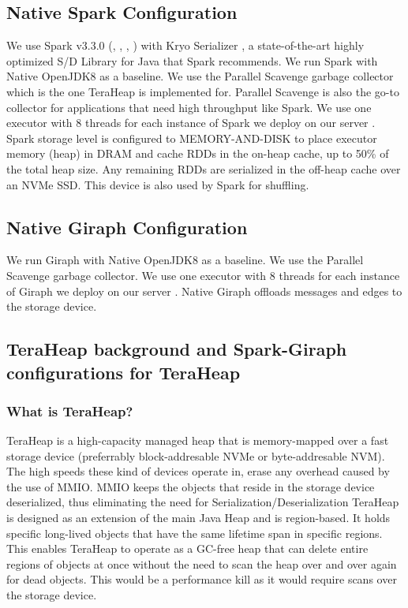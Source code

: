 \subsection{Native Spark Configuration}
We use Spark v3.3.0 (\cite{Building}, \cite{Tuning}, \cite{Conf}, \cite{Monitoring}) with Kryo Serializer \cite{Kryo}, a state-of-the-art highly
optimized S/D Library for Java that Spark recommends. We run Spark
with Native OpenJDK8 \cite{JDK8} as a baseline. We use the Parallel Scavenge
garbage collector which is the one TeraHeap is implemented for.
Parallel Scavenge is also the go-to collector for applications that
need high throughput like Spark. We use one executor with 8
threads for each instance of Spark we deploy on our server \cite{TeraHeap}. Spark storage level
is configured to MEMORY-AND-DISK to place executor memory (heap) in DRAM and cache RDDs \cite{RDD}
in the on-heap cache, up to 50\% of the total heap size. Any remaining
RDDs are serialized in the off-heap cache over an NVMe SSD. This
device is also used by Spark for shuffling. 

\subsection{Native Giraph Configuration}
We run Giraph with Native OpenJDK8 \cite{JDK8} as a baseline. We use the Parallel Scavenge
garbage collector. We use one executor with 8 threads for each instance of Giraph we deploy on our server \cite{TeraHeap}. Native Giraph offloads messages and edges to the storage device.

\subsection{TeraHeap background and Spark-Giraph configurations for TeraHeap}
\subsubsection{What is TeraHeap?}
TeraHeap is a high-capacity managed heap that is memory-mapped over a
fast storage device (preferrably block-addresable NVMe or
byte-addresable NVM). The high speeds these kind of devices operate
in, erase any overhead caused by the use of MMIO. MMIO keeps the objects that reside in the storage
device deserialized, thus eliminating the need for Serialization/Deserialization  TeraHeap is designed
as an extension of the main Java Heap and is region-based. It holds specific long-lived
objects that have the same lifetime span in specific regions. This enables TeraHeap to
operate as a GC-free heap that can delete entire regions of objects at
once without the need to scan the heap over and over again for dead
objects. This would be a performance kill as it would require scans
over the storage device.

